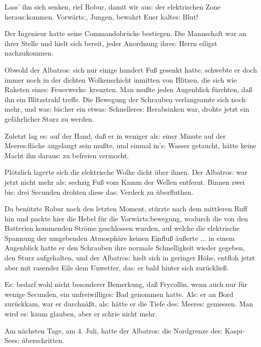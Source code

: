 \documentclass[oneside,12pt]{book}
\newcommand{\s}{s:}
\begin{document}
{\glqq}Lass' ihn sich senken, rief Robur, damit wir au{\s} der
elektrischen Zone herau{\s}kommen. Vorw\"art{\s}, Jungen, bewahrt
Euer kalte{\s} Blut!{\grqq}

Der Ingenieur hatte seine Commandobr\"ucke bestiegen. Die Mannschaft
war an ihrer Stelle und hielt sich bereit, jeder Anordnung ihre{\s}
Herrn eiligst nachzukommen.

Obwohl der {\glqq}Albatro{\s}{\grqq} sich nur einige hundert Fu{\ss}
gesenkt hatte, schwebte er doch immer noch in der dichten
Wolkenschicht inmitten von Blitzen, die sich wie Raketen eine{\s}
Feuerwerk{\s} kreuzten. Man mu{\ss}te jeden Augenblick f\"urchten,
da{\ss} ihn ein Blitzstrahl treffe. Die Bewegung der Schrauben
verlangsamte sich noch mehr, und wa{\s} bi{\s}her ein etwa{\s}
Schnellere{\s} Herabsinken war, drohte jetzt ein gef\"ahrlicher Sturz
zu werden.

Zuletzt lag e{\s} auf der Hand, da{\ss} er in weniger al{\s} einer
Minute auf der Meere{\s}fl\"ache angelangt sein mu{\ss}te, und einmal
in'{\s} Wasser getaucht, h\"atte keine Macht ihn darau{\s} zu
befreien vermocht.

Pl\"otzlich lagerte sich die elektrische Wolke dicht \"uber ihnen.
Der {\glqq}Albatro{\s}{\grqq} war jetzt nicht mehr al{\s} sechzig
Fu{\ss} vom Kamm der Wellen entfernt. Binnen zwei bi{\s} drei
Secunden drohten diese da{\s} Verdeck zu \"uberfluthen.

Da ben\"utzte Robur noch den letzten Moment, st\"urzte nach dem
mittleren Ruff hin und packte hier die Hebel f\"ur die
Vorw\"art{\s}bewegung, wodurch die von den Batterien kommenden
Str\"ome geschlossen wurden, auf welche die elektrische Spannung der
umgebenden Atmosph\"are keinen Einflu{\ss} \"au{\ss}erte ... in einem
Augenblick hatte er den Schrauben ihre normale Schnelligkeit wieder
gegeben, den Sturz aufgehalten, und der {\glqq}Albatro{\s}{\grqq}
hielt sich in geringer H\"ohe, entfloh jetzt aber mit rasender Eile
dem Unwetter, da{\s} er bald hinter sich zur\"ucklie{\ss}.

E{\s} bedarf wohl nicht besonderer Bemerkung, da{\ss} Frycollin, wenn
auch nur f\"ur wenige Secunden, ein unfreiwillige{\s} Bad genommen
hatte. Al{\s} er an Bord zur\"uckkam, war er durchn\"a{\ss}t, al{\s}
h\"atte er die Tiefe de{\s} Meere{\s} gemessen. Man wird e{\s} kaum
glauben, aber er schrie nicht mehr.

Am n\"achsten Tage, am 4. Juli, hatte der {\glqq}Albatro{\s}{\grqq}
die Nordgrenze de{\s} Kaspi-See{\s} \"uberschritten.
\end{document}
